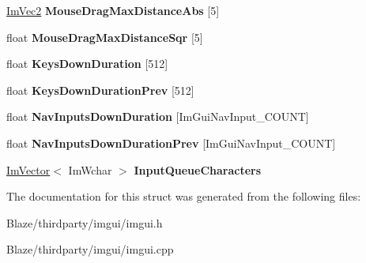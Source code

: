 \begin{DoxyCompactItemize}
\item 
\mbox{\label{structImGuiIO_a402bca8838011fc4518c0895f24ffc92}} 
\hyperlink{structImVec2}{Im\+Vec2} {\bfseries Mouse\+Drag\+Max\+Distance\+Abs} \mbox{[}5\mbox{]}
\item 
\mbox{\label{structImGuiIO_a86c7fe77349fd82a60ab7a279aa27f01}} 
float {\bfseries Mouse\+Drag\+Max\+Distance\+Sqr} \mbox{[}5\mbox{]}
\item 
\mbox{\label{structImGuiIO_a6f1da2ea6d8e3398d9526fe983cf0a6f}} 
float {\bfseries Keys\+Down\+Duration} \mbox{[}512\mbox{]}
\item 
\mbox{\label{structImGuiIO_ac079dcd415784a08fec74388e18abb97}} 
float {\bfseries Keys\+Down\+Duration\+Prev} \mbox{[}512\mbox{]}
\item 
\mbox{\label{structImGuiIO_a4709a8f5435a50387d60ccb6fa928cf6}} 
float {\bfseries Nav\+Inputs\+Down\+Duration} \mbox{[}Im\+Gui\+Nav\+Input\+\_\+\+C\+O\+U\+NT\mbox{]}
\item 
\mbox{\label{structImGuiIO_ae2301639fd3e881177815d3b0133068f}} 
float {\bfseries Nav\+Inputs\+Down\+Duration\+Prev} \mbox{[}Im\+Gui\+Nav\+Input\+\_\+\+C\+O\+U\+NT\mbox{]}
\item 
\mbox{\label{structImGuiIO_a4d9fb1151f10f1f6f7597bb3a21e1447}} 
\hyperlink{structImVector}{Im\+Vector}$<$ Im\+Wchar $>$ {\bfseries Input\+Queue\+Characters}
\end{DoxyCompactItemize}


The documentation for this struct was generated from the following files\+:\begin{DoxyCompactItemize}
\item 
Blaze/thirdparty/imgui/imgui.\+h\item 
Blaze/thirdparty/imgui/imgui.\+cpp\end{DoxyCompactItemize}
